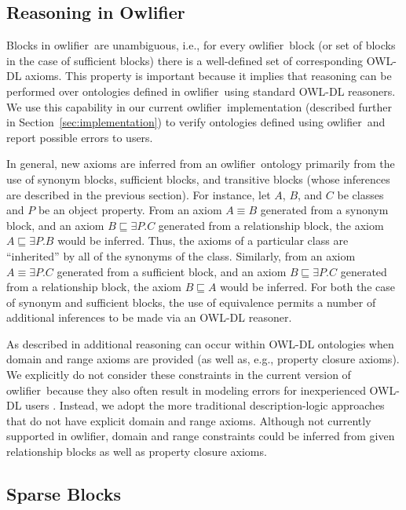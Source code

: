 \documentclass[preprint,number]{elsarticle}
\newcommand{\Owlifier}{\textsf{Owlifier}}
\newcommand{\owlifier}{\textsf{owlifier}}
\newcommand{\secref}[1]{Section~\ref{#1}}
\begin{document}
\subsection{Reasoning in \Owlifier}

Blocks in \owlifier\ are unambiguous, i.e., for every \owlifier\ block
(or set of blocks in the case of sufficient blocks) there is a
well-defined set of corresponding OWL-DL axioms. This property is
important because it implies that reasoning can be performed over
ontologies defined in \owlifier\ using standard OWL-DL reasoners.  We
use this capability in our current \owlifier\ implementation
(described further in \secref{sec:implementation}) to verify
ontologies defined using \owlifier\ and report possible errors to
users.

In general, new axioms are inferred from an \owlifier\ ontology
primarily from the use of synonym blocks, sufficient blocks, and
transitive blocks (whose inferences are described in the previous
section). For instance, let $A$, $B$, and $C$ be classes and $P$ be an
object property. From an axiom $A \equiv B$ generated from a synonym
block, and an axiom $B \sqsubseteq \exists P.C$ generated from a
relationship block, the axiom $A \sqsubseteq \exists P.B$ would be
inferred. Thus, the axioms of a particular class are ``inherited'' by
all of the synonyms of the class. Similarly, from an axiom $A \equiv
\exists P. C$ generated from a sufficient block, and an axiom $B
\sqsubseteq \exists P.C$ generated from a relationship block, the axiom
$B \sqsubseteq A$ would be inferred. For both the case of synonym and
sufficient blocks, the use of equivalence permits a number of
additional inferences to be made via an OWL-DL reasoner.

As described in \cite{rector04:_owl_pizzas} additional reasoning can
occur within OWL-DL ontologies when domain and range axioms are
provided (as well as, e.g., property closure axioms).  We explicitly
do not consider these constraints in the current version of \owlifier\
because they also often result in modeling errors for inexperienced
OWL-DL users \cite{rector04:_owl_pizzas}. Instead, we adopt the more
traditional description-logic approaches that do not have explicit
domain and range axioms.  Although not currently supported in
\owlifier, domain and range constraints could be inferred from given
relationship blocks as well as property closure axioms. 

\subsection{Sparse Blocks} 
\end{document}
